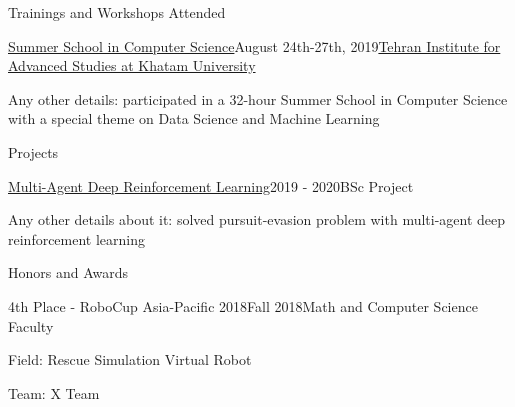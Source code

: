 \documentclass{resume} %
\begin{document}
    \begin{rSection}{Trainings and Workshops Attended}
        \begin{rSubsection}{\href{https://link_to_your_degree.com}{\textcolor{coolblack}{Summer School in Computer Science}}}{August 24th-27th, 2019}{\href{https://teias.institute/data-science-and-machine-learning/}{\textcolor{coolblack}{Tehran Institute for Advanced Studies at Khatam University}}}{ }
            \item Any other details: participated in a 32-hour Summer School in Computer Science with a special theme on Data Science and Machine Learning
        \end{rSubsection}
    \end{rSection}

    \begin{rSection}{Projects}
        \begin{rSubsection}{\href{https://link_to_your_project}{\textcolor{coolblack}{Multi-Agent Deep Reinforcement Learning}}}{2019 - 2020}{BSc Project}{ }
            \item Any other details about it: solved pursuit-evasion problem with multi-agent deep reinforcement learning
        \end{rSubsection}
    \end{rSection}

    \begin{rSection}{Honors and Awards}
        \begin{rSubsection}{4th Place - RoboCup Asia-Pacific 2018}{Fall 2018}{Math and Computer Science Faculty}{ }
            \item Field: Rescue Simulation Virtual Robot
            \item Team: X Team
        \end{rSubsection}
    \end{rSection}
\end{document}
